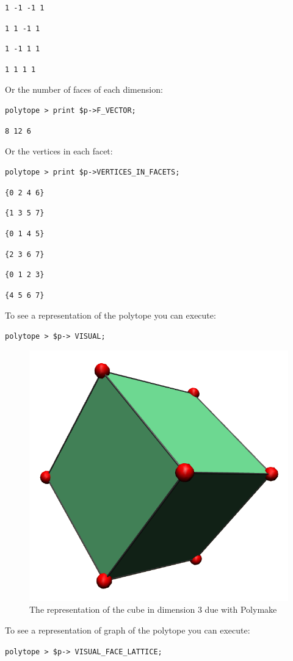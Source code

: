 \texttt{1 -1 -1 1}

\texttt{1 1 -1 1}

\texttt{1 -1 1 1}

\texttt{1 1 1 1}

Or the number of faces of each dimension:

\texttt{polytope > print \$p->F\_VECTOR;}

\texttt{8 12 6}

Or the vertices in each facet:

\texttt{polytope > print \$p->VERTICES\_IN\_FACETS;}

\texttt{\{0 2 4 6\}}

\texttt{\{1 3 5 7\}}

\texttt{\{0 1 4 5\}}

\texttt{\{2 3 6 7\}}

\texttt{\{0 1 2 3\}}

\texttt{\{4 5 6 7\}}

To see a representation of the polytope you can execute:

\texttt{polytope > \$p-> VISUAL;}

\begin{figure}[htbp]
  \centering
  \includegraphics[width=.5\linewidth]{l6_cube.png}
  
  \caption{The representation of the cube in dimension 3 due with Polymake}
\label{fig:l6:1}
\end{figure}

To see a representation of graph of the polytope you can execute:

\texttt{polytope > \$p-> VISUAL\_FACE\_LATTICE;}

